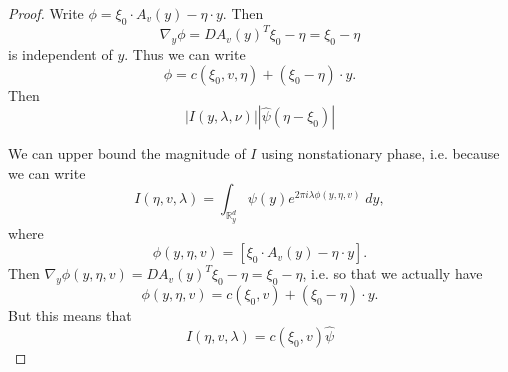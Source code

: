 \documentclass[dvipsnames,letterpaper,12pt]{article}
\DeclareMathOperator{\RR}{\mathbb{R}}
\begin{document}
\begin{proof}
    Write $\phi = \xi_0 \cdot A_v(y) - \eta \cdot y$. Then
    \[ \nabla_y \phi = DA_v(y)^T \xi_0 - \eta = \xi_0 - \eta \]
    is independent of $y$. Thus we can write
    \[ \phi = c(\xi_0,v,\eta) + (\xi_0 - \eta) \cdot y. \]
    Then
    \[ |I(y,\lambda,\nu)| |\widehat{\psi}(\eta - \xi_0)| \]

    We can upper bound the magnitude of $I$ using nonstationary phase, i.e. because we can write
    \[ I(\eta,v,\lambda) = \int_{\RR^d_y} \psi(y) e^{2 \pi i \lambda \phi(y,\eta,v)}\; dy, \]
    where
    \[ \phi(y,\eta,v) = [\xi_0 \cdot A_v(y) - \eta \cdot y]. \]
    Then $\nabla_y \phi(y,\eta,v) = DA_v(y)^T \xi_0 - \eta = \xi_0 - \eta$, i.e. so that we actually have
    \[ \phi(y,\eta,v) = c(\xi_0,v) + (\xi_0 - \eta) \cdot y. \]
    But this means that
    \[ I(\eta,v,\lambda) = c(\xi_0,v) \widehat{\psi} \]


\end{proof}
\end{document}
